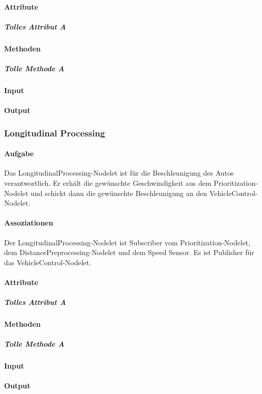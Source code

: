 \documentclass[a4paper, 12pt, titlepage]{scrartcl}
\begin{document}
				\paragraph{Attribute}
					\subparagraph{Tolles Attribut A}
				\paragraph{Methoden}
					\subparagraph{Tolle Methode A}
				\paragraph{Input}
				\paragraph{Output}
			
			\subsubsection{Longitudinal Processing}
			\label{longitudinal_processing}
				\paragraph{Aufgabe} Das LongitudinalProcessing-Nodelet ist für die Beschleunigung des Autos verantwortlich. Er erhält die gewünschte Geschwindigkeit aus dem Prioritization-Nodelet und schickt dann die gewünschte Beschleunigung an den VehicleControl-Nodelet. 
				\paragraph{Assoziationen} Der LongitudinalProcessing-Nodelet ist Subscriber vom Prioritization-Nodelet, dem DistancePreprocessing-Nodelet und dem Speed Sensor. Es ist Publisher für das VehicleControl-Nodelet. 
				\paragraph{Attribute}
					\subparagraph{Tolles Attribut A}
				\paragraph{Methoden}
					\subparagraph{Tolle Methode A}
				\paragraph{Input}
				\paragraph{Output}
						
\end{document}
